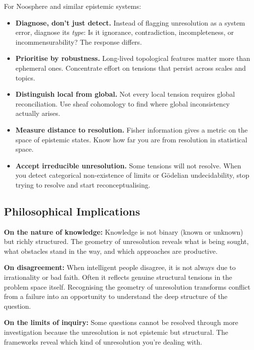 \documentclass[11pt,letterpaper]{article}
\theoremstyle{definition}
\theoremstyle{remark}
\begin{document}
For Noosphere and similar epistemic systems:

\begin{itemize}
\item \textbf{Diagnose, don't just detect.} Instead of flagging unresolution as a system error, diagnose its \emph{type}: Is it ignorance, contradiction, incompleteness, or incommensurability? The response differs.

\item \textbf{Prioritise by robustness.} Long-lived topological features matter more than ephemeral ones. Concentrate effort on tensions that persist across scales and topics.

\item \textbf{Distinguish local from global.} Not every local tension requires global reconciliation. Use sheaf cohomology to find where global inconsistency actually arises.

\item \textbf{Measure distance to resolution.} Fisher information gives a metric on the space of epistemic states. Know how far you are from resolution in statistical space.

\item \textbf{Accept irreducible unresolution.} Some tensions will not resolve. When you detect categorical non-existence of limits or Gödelian undecidability, stop trying to resolve and start reconceptualising.
\end{itemize}

\subsection*{Philosophical Implications}

\textbf{On the nature of knowledge:} Knowledge is not binary (known or unknown) but richly structured. The geometry of unresolution reveals what is being sought, what obstacles stand in the way, and which approaches are productive.

\textbf{On disagreement:} When intelligent people disagree, it is not always due to irrationality or bad faith. Often it reflects genuine structural tensions in the problem space itself. Recognising the geometry of unresolution transforms conflict from a failure into an opportunity to understand the deep structure of the question.

\textbf{On the limits of inquiry:} Some questions cannot be resolved through more investigation because the unresolution is not epistemic but structural. The frameworks reveal which kind of unresolution you're dealing with.
\end{document}
